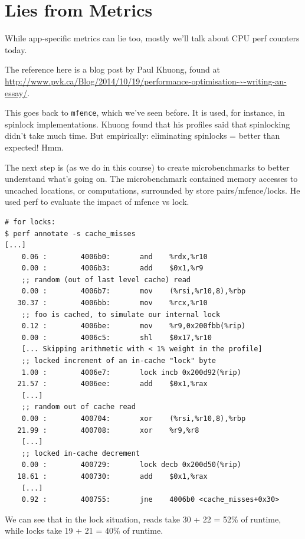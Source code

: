 \section*{Lies from Metrics}
While app-specific metrics can lie too, mostly we'll talk about CPU
perf counters today.

The reference here is a blog post by Paul Khuong, found at 
\url{http://www.pvk.ca/Blog/2014/10/19/performance-optimisation-~-writing-an-essay/}.

This goes back to {\tt mfence}, which we've seen before. It is used, for instance, in
spinlock implementations. Khuong found that his profiles said that spinlocking didn't take much time.
But empirically: eliminating spinlocks = better than expected! Hmm.

The next step is (as we do in this course) to create microbenchmarks to better understand what's
going on. The microbenchmark contained memory accesses to uncached locations, or computations,
surrounded by store pairs/mfence/locks. He used perf to evaluate the impact of mfence vs lock.

{\scriptsize
\begin{lstlisting}
# for locks:
$ perf annotate -s cache_misses
[...]
    0.06 :        4006b0:       and    %rdx,%r10
    0.00 :        4006b3:       add    $0x1,%r9
    ;; random (out of last level cache) read
    0.00 :        4006b7:       mov    (%rsi,%r10,8),%rbp
   30.37 :        4006bb:       mov    %rcx,%r10
    ;; foo is cached, to simulate our internal lock
    0.12 :        4006be:       mov    %r9,0x200fbb(%rip)
    0.00 :        4006c5:       shl    $0x17,%r10
    [... Skipping arithmetic with < 1% weight in the profile]
    ;; locked increment of an in-cache "lock" byte
    1.00 :        4006e7:       lock incb 0x200d92(%rip)
   21.57 :        4006ee:       add    $0x1,%rax
    [...]
    ;; random out of cache read
    0.00 :        400704:       xor    (%rsi,%r10,8),%rbp
   21.99 :        400708:       xor    %r9,%r8
    [...]
    ;; locked in-cache decrement
    0.00 :        400729:       lock decb 0x200d50(%rip)
   18.61 :        400730:       add    $0x1,%rax
    [...]
    0.92 :        400755:       jne    4006b0 <cache_misses+0x30>
\end{lstlisting}
}

We can see that in the lock situation, reads take 30 + 22 = 52\% of runtime,
while locks take 19 + 21 = 40\% of runtime.

